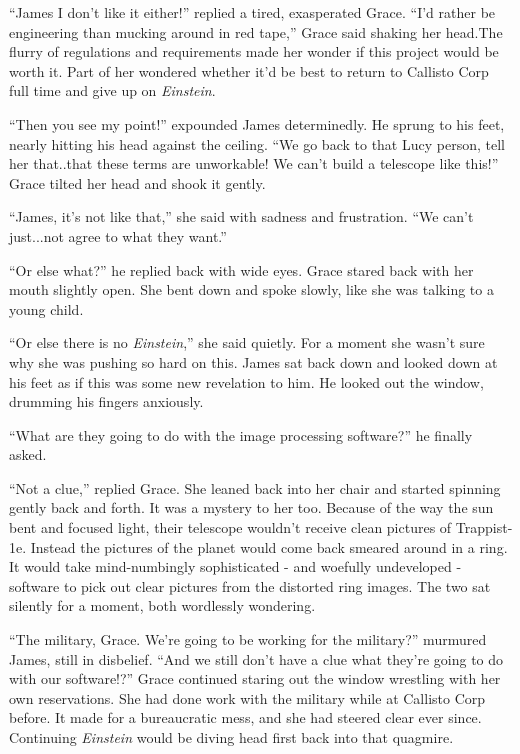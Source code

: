 \documentclass[12pt]{article} %
\begin{document}
``James I don't like it either!'' replied a tired, exasperated Grace. ``I'd rather be engineering than mucking around in red tape,'' Grace said shaking her head.The flurry of regulations and requirements made her wonder if this project would be worth it. Part of her wondered whether it'd be best to return to Callisto Corp full time and give up on \textit{Einstein}.

``Then you see my point!'' expounded James determinedly. He sprung to his feet, nearly hitting his head against the ceiling. ``We go back to that Lucy person, tell her that..that these terms are unworkable! We can't build a telescope like this!'' Grace tilted her head and shook it gently.

``James, it's not like that,'' she said with sadness and frustration. ``We can't just...not agree to what they want.''

``Or else what?'' he replied back with wide eyes. Grace stared back with her mouth slightly open. She bent down and spoke slowly, like she was talking to a young child.

``Or else there is no \textit{Einstein},'' she said quietly. For a moment she wasn't sure why she was pushing so hard on this. James sat back down and looked down at his feet as if this was some new revelation to him. He looked out the window, drumming his fingers anxiously.

``What are they going to do with the image processing software?'' he finally asked.

``Not a clue,'' replied Grace. She leaned back into her chair and started spinning gently back and forth. It was a mystery to her too. Because of the way the sun bent and focused light, their telescope wouldn't receive clean pictures of Trappist-1e. Instead the pictures of the planet would come back smeared around in a ring. It would take mind-numbingly sophisticated - and woefully undeveloped - software to pick out clear pictures from the distorted ring images. The two sat silently for a moment, both wordlessly wondering.

``The military, Grace. We're going to be working for the military?'' murmured James, still in disbelief. ``And we still don't have a clue what they're going to do with our software!?'' Grace continued staring out the window wrestling with her own reservations. She had done work with the military while at Callisto Corp before. It made for a bureaucratic mess, and she had steered clear ever since. Continuing \textit{Einstein} would be diving head first back into that quagmire.
\end{document}

